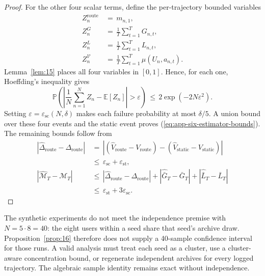 \documentclass{article} %
\renewcommand{\eqref}[1]{\textup{(\ref{#1})}}
\begin{document}
\begin{proof}
For the other four scalar terms, define the per-trajectory bounded variables
\begin{equation}
\label{eq:app-six-proof-Z-defs}
\begin{aligned}
Z_n^{\mathrm{route}}
&\,=\,
m_{n,1},
\\
Z_n^{G}
&\,=\,
\frac{1}{T}\sum_{t=1}^{T}G_{n,t},
\\
Z_n^{L}
&\,=\,
\frac{1}{T}\sum_{t=1}^{T}L_{n,t},
\\
Z_n^{\mathcal{V}}
&\,=\,
\frac{1}{T}\sum_{t=1}^{T}\mu(U_n,a_{n,t}).
\end{aligned}
\end{equation}
Lemma~\ref{lem:15} places all four variables in \([0,1]\). Hence, for each
one, Hoeffding's inequality gives
\begin{equation}
\mathbb{P}\!\left(
\left|
\frac{1}{N}\sum_{n=1}^{N}Z_n-\mathbb{E}[Z_n]
\right|>\varepsilon
\right)
\,\le\,
2\exp(-2N\varepsilon^2).
\end{equation}
Setting \(\varepsilon=\varepsilon_{\mathrm{sc}}(N,\delta)\) makes each
failure probability at most \(\delta/5\). A union bound over these four events
and the static event proves \eqref{eq:app-six-estimator-bounds}. The remaining
bounds follow from
\begin{equation}
\begin{aligned}
\left|
\widehat\Delta_{\mathrm{route}}-\Delta_{\mathrm{route}}
\right|
&\,=\,
\left|
(\widehat V_{\mathrm{route}}-V_{\mathrm{route}})
-
(\widehat V_{\mathrm{static}}-V_{\mathrm{static}})
\right|
\\
&\,\le\,
\varepsilon_{\mathrm{sc}}
+
\varepsilon_{\mathrm{st}},
\\
|\widehat{\mathcal M}_T-\mathcal M_T|
&\,\le\,
|\widehat\Delta_{\mathrm{route}}-\Delta_{\mathrm{route}}|
+
|\widehat{\bar G}_T-\bar G_T|
+
|\widehat{\bar L}_T-\bar L_T|
\\
&\,\le\,
\varepsilon_{\mathrm{st}}+3\varepsilon_{\mathrm{sc}}.
\end{aligned}
\end{equation}
\end{proof}

The synthetic experiments do not meet the independence premise with
$N=5\cdot8=40$: the eight users within a seed share that seed's archive draw.
Proposition~\ref{prop:16} therefore does not supply a 40-sample confidence
interval for those runs. A valid analysis must treat each seed as a cluster,
use a cluster-aware concentration bound, or regenerate independent archives
for every logged trajectory. The algebraic sample identity remains exact
without independence.
\end{document}
